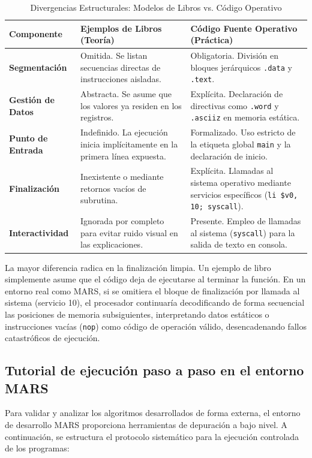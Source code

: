 \documentclass[12pt,letterpaper]{article}
\begin{document}
\begin{table}[h!]
\centering
\caption{Divergencias Estructurales: Modelos de Libros vs. Código Operativo}
\vspace{0.3cm}
\begin{tabular}{l p{5.5cm} p{5.5cm}}
\toprule
\textbf{Componente} & \textbf{Ejemplos de Libros (Teoría)} & \textbf{Código Fuente Operativo (Práctica)} \\
\midrule
\textbf{Segmentación} & Omitida. Se listan secuencias directas de instrucciones aisladas. & Obligatoria. División en bloques jerárquicos \texttt{.data} y \texttt{.text}. \\
\midrule
\textbf{Gestión de Datos} & Abstracta. Se asume que los valores ya residen en los registros. & Explícita. Declaración de directivas como \texttt{.word} y \texttt{.asciiz} en memoria estática. \\
\midrule
\textbf{Punto de Entrada} & Indefinido. La ejecución inicia implícitamente en la primera línea expuesta. & Formalizado. Uso estricto de la etiqueta global \texttt{main} y la declaración de inicio. \\
\midrule
\textbf{Finalización} & Inexistente o mediante retornos vacíos de subrutina. & Explícita. Llamadas al sistema operativo mediante servicios específicos (\texttt{li \$v0, 10; syscall}). \\
\midrule
\textbf{Interactividad} & Ignorada por completo para evitar ruido visual en las explicaciones. & Presente. Empleo de llamadas al sistema (\texttt{syscall}) para la salida de texto en consola. \\
\bottomrule
\end{tabular}
\end{table}

La mayor diferencia radica en la finalización limpia. Un ejemplo de libro simplemente asume que el código deja de ejecutarse al terminar la función. En un entorno real como MARS, si se omitiera el bloque de finalización por llamada al sistema (servicio 10), el procesador continuaría decodificando de forma secuencial las posiciones de memoria subsiguientes, interpretando datos estáticos o instrucciones vacías (\texttt{nop}) como código de operación válido, desencadenando fallos catastróficos de ejecución.

\subsection{Tutorial de ejecución paso a paso en el entorno MARS}
Para validar y analizar los algoritmos desarrollados de forma externa, el entorno de desarrollo MARS proporciona herramientas de depuración a bajo nivel. A continuación, se estructura el protocolo sistemático para la ejecución controlada de los programas:
\end{document}
